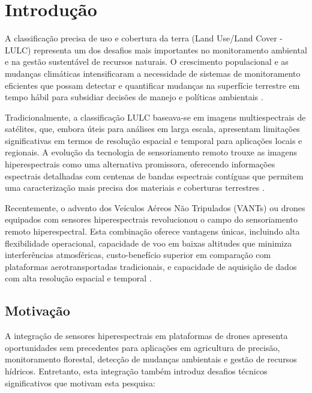 \chapter{Introdução}\label{chp:Introducao}

A classificação precisa de uso e cobertura da terra (Land Use/Land Cover - LULC) representa um dos desafios mais importantes no monitoramento ambiental e na gestão sustentável de recursos naturais. O crescimento populacional e as mudanças climáticas intensificaram a necessidade de sistemas de monitoramento eficientes que possam detectar e quantificar mudanças na superfície terrestre em tempo hábil para subsidiar decisões de manejo e políticas ambientais \cite{Lou2024}.

Tradicionalmente, a classificação LULC baseava-se em imagens multiespectrais de satélites, que, embora úteis para análises em larga escala, apresentam limitações significativas em termos de resolução espacial e temporal para aplicações locais e regionais. A evolução da tecnologia de sensoriamento remoto trouxe as imagens hiperespectrais como uma alternativa promissora, oferecendo informações espectrais detalhadas com centenas de bandas espectrais contíguas que permitem uma caracterização mais precisa dos materiais e coberturas terrestres \cite{Shin2024}.

Recentemente, o advento dos Veículos Aéreos Não Tripulados (VANTs) ou drones equipados com sensores hiperespectrais revolucionou o campo do sensoriamento remoto hiperespectral. Esta combinação oferece vantagens únicas, incluindo alta flexibilidade operacional, capacidade de voo em baixas altitudes que minimiza interferências atmosféricas, custo-benefício superior em comparação com plataformas aerotransportadas tradicionais, e capacidade de aquisição de dados com alta resolução espacial e temporal \cite{Shin2024}.

\section{Motivação}\label{sec:motivacao}

A integração de sensores hiperespectrais em plataformas de drones apresenta oportunidades sem precedentes para aplicações em agricultura de precisão, monitoramento florestal, detecção de mudanças ambientais e gestão de recursos hídricos. Entretanto, esta integração também introduz desafios técnicos significativos que motivam esta pesquisa:

